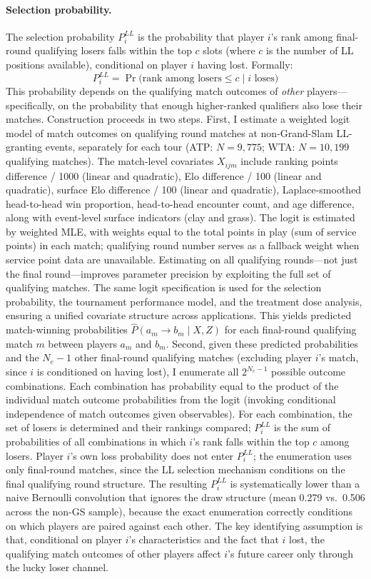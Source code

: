 \paragraph{Selection probability.} The selection probability $P_i^{LL}$ is the probability that player $i$'s rank among final-round qualifying losers falls within the top $c$ slots (where $c$ is the number of LL positions available), conditional on player $i$ having lost. Formally:
\[
P_i^{LL} = \Pr\bigl(\text{rank among losers} \leq c \mid i \text{ loses}\bigr)
\]
This probability depends on the qualifying match outcomes of \textit{other} players---specifically, on the probability that enough higher-ranked qualifiers also lose their matches. Construction proceeds in two steps. First, I estimate a weighted logit model of match outcomes on qualifying round matches at non-Grand-Slam LL-granting events, separately for each tour (ATP: $N = 9{,}775$; WTA: $N = 10{,}199$ qualifying matches). The match-level covariates $X_{ijm}$ include ranking points difference / 1000 (linear and quadratic), Elo difference / 100 (linear and quadratic), surface Elo difference / 100 (linear and quadratic), Laplace-smoothed head-to-head win proportion, head-to-head encounter count, and age difference, along with event-level surface indicators (clay and grass). The logit is estimated by weighted MLE, with weights equal to the total points in play (sum of service points) in each match; qualifying round number serves as a fallback weight when service point data are unavailable. Estimating on all qualifying rounds---not just the final round---improves parameter precision by exploiting the full set of qualifying matches. The same logit specification is used for the selection probability, the tournament performance model, and the treatment dose analysis, ensuring a unified covariate structure across applications. This yields predicted match-winning probabilities $\hat{P}(a_m \to b_m \mid X, Z)$ for each final-round qualifying match $m$ between players $a_m$ and $b_m$. Second, given these predicted probabilities and the $N_e - 1$ other final-round qualifying matches (excluding player $i$'s match, since $i$ is conditioned on having lost), I enumerate all $2^{N_e - 1}$ possible outcome combinations. Each combination has probability equal to the product of the individual match outcome probabilities from the logit (invoking conditional independence of match outcomes given observables). For each combination, the set of losers is determined and their rankings compared; $P_i^{LL}$ is the sum of probabilities of all combinations in which $i$'s rank falls within the top $c$ among losers. Player $i$'s own loss probability does not enter $P_i^{LL}$; the enumeration uses only final-round matches, since the LL selection mechanism conditions on the final qualifying round structure. The resulting $P_i^{LL}$ is systematically lower than a naive Bernoulli convolution that ignores the draw structure (mean 0.279 vs.\ 0.506 across the non-GS sample), because the exact enumeration correctly conditions on which players are paired against each other. The key identifying assumption is that, conditional on player $i$'s characteristics and the fact that $i$ lost, the qualifying match outcomes of other players affect $i$'s future career only through the lucky loser channel.

